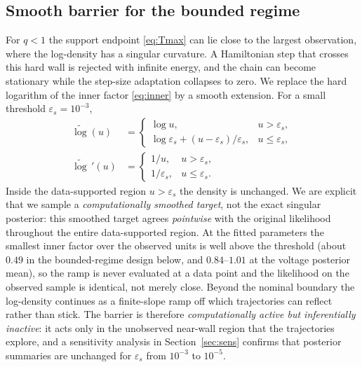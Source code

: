 \documentclass[ASNA,twocolumn]{USG}
\begin{document}
\subsection{Smooth barrier for the bounded regime}\label{sec:barrier}
For $q<1$ the support endpoint \eqref{eq:Tmax} can lie close to the largest
observation, where the log-density has a singular curvature. A Hamiltonian
step that crosses this hard wall is rejected with infinite energy, and the
chain can become stationary while the step-size adaptation collapses to
zero. We replace the hard logarithm of the inner factor \eqref{eq:inner} by
a smooth extension. For a small threshold $\varepsilon_s=10^{-3}$,
\begin{equation}\label{eq:slog}
\begin{aligned}
\widetilde{\log}(u)&=\begin{cases}
\log u, & u>\varepsilon_s,\\
\log\varepsilon_s+(u-\varepsilon_s)/\varepsilon_s, & u\le\varepsilon_s,
\end{cases}\\[3pt]
\widetilde{\log}\,'(u)&=\begin{cases}
1/u, & u>\varepsilon_s,\\
1/\varepsilon_s, & u\le\varepsilon_s .
\end{cases}
\end{aligned}
\end{equation}
Inside the data-supported region $u>\varepsilon_s$ the density is
unchanged. We are explicit that we sample a \emph{computationally smoothed
target}, not the exact singular posterior: this smoothed target agrees
\emph{pointwise} with the original likelihood throughout the entire
data-supported region. At the fitted parameters the smallest inner factor
over the observed units is well above the threshold (about $0.49$ in the
bounded-regime design below, and $0.84$--$1.01$ at the voltage posterior
mean), so the ramp is never evaluated at a data point and the likelihood on
the observed sample is identical, not merely close. Beyond the nominal
boundary the log-density continues as a finite-slope ramp off which
trajectories can reflect rather than stick. The barrier is therefore
\emph{computationally active but inferentially inactive}: it acts only in
the unobserved near-wall region that the trajectories explore, and a
sensitivity analysis in Section~\ref{sec:sens} confirms that posterior
summaries are unchanged for $\varepsilon_s$ from $10^{-3}$ to
$10^{-5}$.
\end{document}
